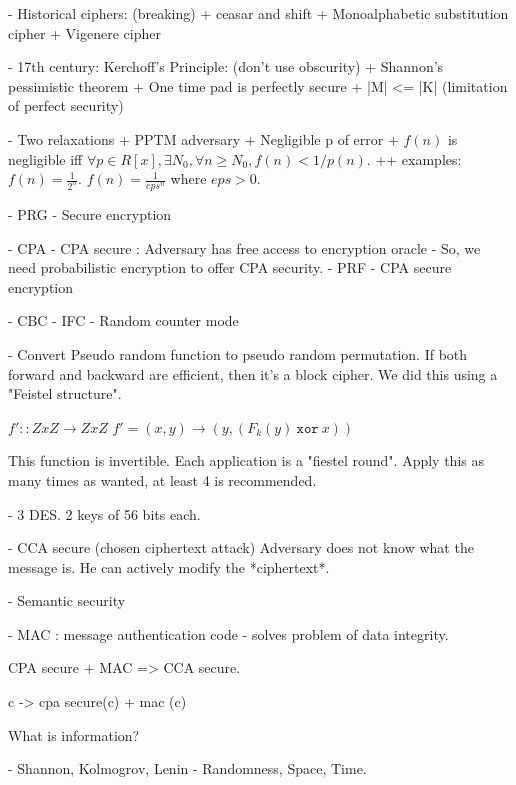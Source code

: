 - Historical ciphers:  (breaking)
+ ceasar and shift
+ Monoalphabetic substitution cipher
+  Vigenere cipher

- 17th century: Kerchoff's Principle: (don't use obscurity)
+ Shannon's pessimistic theorem 
+ One time pad is perfectly secure
+ |M| <= |K| (limitation of perfect security)


- Two relaxations
+ PPTM adversary
+ Negligible p of error
+ $f(n)$ is negligible iff $\forall p \in R[x], \exists N_0, \forall n \geq N_0, f(n) < 1 / p(n)$.
++ examples: $f(n) = \frac{1}{2^n}$. $f(n) = \frac{1}{eps^n}$ where $eps > 0$.


- PRG
- Secure encryption

- CPA
- CPA secure : Adversary has free access to encryption oracle
- So, we need probabilistic encryption to offer CPA security.
- PRF
- CPA secure encryption

- CBC
- IFC
- Random counter mode

- Convert Pseudo random function to pseudo random permutation. If both
  forward and backward are efficient, then it's a block cipher. We did this
  using a "Feistel structure".

$f' :: Z x Z \to Z x Z$
$f' = (x, y) \to (y, (F_k(y)~\texttt{xor}~x))$

This function is invertible.
Each application is a "fiestel round".
Apply this as many times as wanted, at least 4 is recommended.


- 3 DES. 2 keys of 56 bits each.


- CCA secure (chosen ciphertext attack)
  Adversary does not know what the message is. He can actively modify the 
  *ciphertext*.

- Semantic security


- MAC : message authentication code - solves problem of data integrity.

CPA secure + MAC => CCA secure.

c -> cpa secure(c) + mac (c)


What is information?

- Shannon,  Kolmogrov, Lenin
- Randomness, Space, Time.

